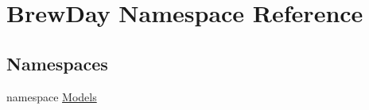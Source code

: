 \hypertarget{namespace_brew_day}{}\section{Brew\+Day Namespace Reference}
\label{namespace_brew_day}
\subsection*{Namespaces}
\begin{DoxyCompactItemize}
\item 
namespace \mbox{\hyperlink{namespace_brew_day_1_1_models}{Models}}
\end{DoxyCompactItemize}
